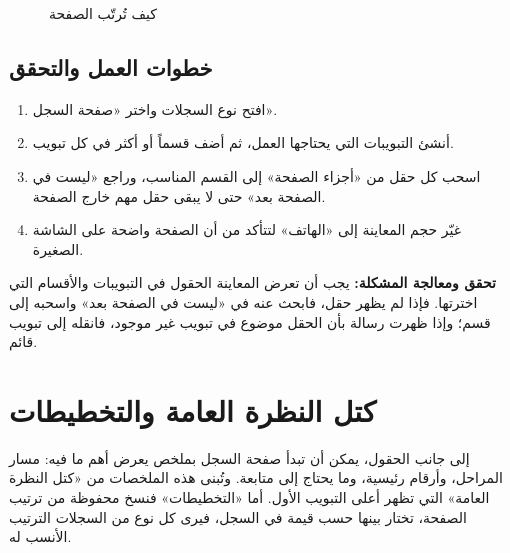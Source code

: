 \begin{figure}[H]
\centering
{}
\rclegend
\caption{كيف تُرتّب الصفحة}
\label{fig:builder-record-page-tree}
\end{figure}

\subsection{خطوات العمل والتحقق}
\begin{enumerate}
\item افتح نوع السجلات واختر «صفحة السجل».
\item أنشئ التبويبات التي يحتاجها العمل، ثم أضف قسماً أو أكثر في كل تبويب.
\item اسحب كل حقل من «أجزاء الصفحة» إلى القسم المناسب، وراجع «ليست في الصفحة بعد» حتى لا يبقى حقل مهم خارج الصفحة.
\item غيّر حجم المعاينة إلى «الهاتف» لتتأكد من أن الصفحة واضحة على الشاشة الصغيرة.
\end{enumerate}

\textbf{تحقق ومعالجة المشكلة:} يجب أن تعرض المعاينة الحقول في التبويبات والأقسام التي اخترتها. فإذا لم يظهر حقل، فابحث عنه في «ليست في الصفحة بعد» واسحبه إلى قسم؛ وإذا ظهرت رسالة بأن الحقل موضوع في تبويب غير موجود، فانقله إلى تبويب قائم.

\clearpage
\section{كتل النظرة العامة والتخطيطات}
\label{sec:builder-feature-record-page-blocks}

إلى جانب الحقول، يمكن أن تبدأ صفحة السجل بملخص يعرض أهم ما فيه: مسار المراحل، وأرقام رئيسية، وما يحتاج إلى متابعة. وتُبنى هذه الملخصات من «كتل النظرة العامة» التي تظهر أعلى التبويب الأول. أما «التخطيطات» فنسخ محفوظة من ترتيب الصفحة، تختار بينها حسب قيمة في السجل، فيرى كل نوع من السجلات الترتيب الأنسب له.

